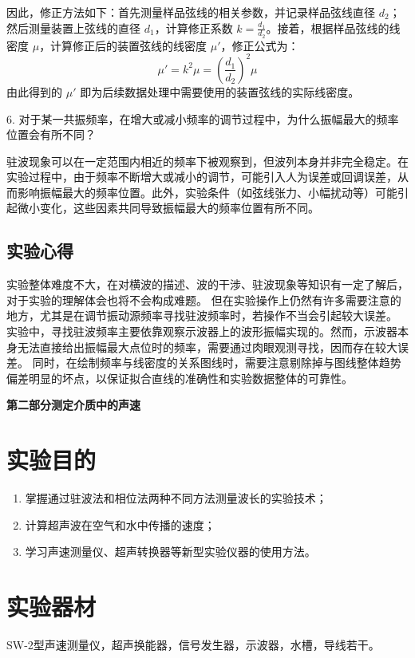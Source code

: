 \documentclass[UTF-8,twoside,cs4size]{ctexart}
\begin{document}
{\kaishu 因此，修正方法如下：首先测量样品弦线的相关参数，并记录样品弦线直径 $d_2$；然后测量装置上弦线的直径 $d_1$，计算修正系数 $k = \frac{d_1}{d_2}$。接着，根据样品弦线的线密度 $\mu$，计算修正后的装置弦线的线密度 $\mu'$，修正公式为：}
\[
\mu' = k^2 \mu = \left(\frac{d_1}{d_2}\right)^2 \mu
\]
{\kaishu 由此得到的 $\mu'$ 即为后续数据处理中需要使用的装置弦线的实际线密度。}

6. 对于某一共振频率，在增大或减小频率的调节过程中，为什么振幅最大的频率位置会有所不同？

{\kaishu 驻波现象可以在一定范围内相近的频率下被观察到，但波列本身并非完全稳定。在实验过程中，由于频率不断增大或减小的调节，可能引入人为误差或回调误差，从而影响振幅最大的频率位置。此外，实验条件（如弦线张力、小幅扰动等）可能引起微小变化，这些因素共同导致振幅最大的频率位置有所不同。}


\subsection{实验心得}
实验整体难度不大，在对横波的描述、波的干涉、驻波现象等知识有一定了解后，对于实验的理解体会也将不会构成难题。
但在实验操作上仍然有许多需要注意的地方，尤其是在调节振动源频率寻找驻波频率时，若操作不当会引起较大误差。
实验中，寻找驻波频率主要依靠观察示波器上的波形振幅实现的。然而，示波器本身无法直接给出振幅最大点位时的频率，需要通过肉眼观测寻找，因而存在较大误差。
同时，在绘制频率与线密度的关系图线时，需要注意剔除掉与图线整体趋势偏差明显的坏点，以保证拟合直线的准确性和实验数据整体的可靠性。


\begin{center}
    \Large\bfseries 第二部分\quad 测定介质中的声速
\end{center}
\setcounter{section}{0}
\section{实验目的}

\begin{enumerate}
    \item 掌握通过驻波法和相位法两种不同方法测量波长的实验技术；
    \item 计算超声波在空气和水中传播的速度；
    \item 学习声速测量仪、超声转换器等新型实验仪器的使用方法。
\end{enumerate}

\section{实验器材}
SW-2型声速测量仪，超声换能器，信号发生器，示波器，水槽，导线若干。
\end{document}
